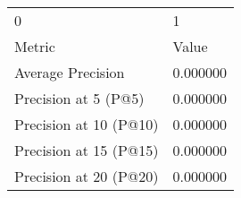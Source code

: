 \begin{tabular}{ll}
0 & 1 \\
Metric & Value \\
Average Precision & 0.000000 \\
Precision at 5 (P@5) & 0.000000 \\
Precision at 10 (P@10) & 0.000000 \\
Precision at 15 (P@15) & 0.000000 \\
Precision at 20 (P@20) & 0.000000 \\
\end{tabular}
